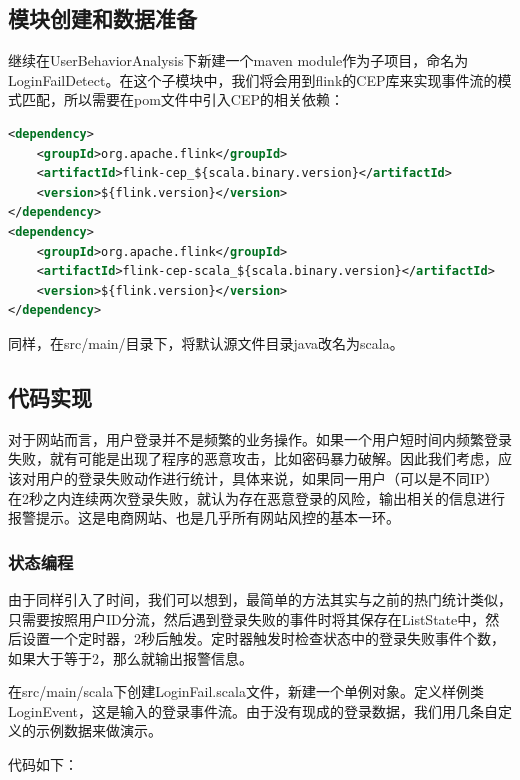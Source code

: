 \documentclass[oneside]{ctexbook}
\begin{document}
\subsection{模块创建和数据准备}

继续在UserBehaviorAnalysis下新建一个maven module作为子项目，命名为LoginFailDetect。在这个子模块中，我们将会用到flink的CEP库来实现事件流的模式匹配，所以需要在pom文件中引入CEP的相关依赖：

\begin{lstlisting}[language=xml]
<dependency>
    <groupId>org.apache.flink</groupId>
    <artifactId>flink-cep_${scala.binary.version}</artifactId>
    <version>${flink.version}</version>
</dependency>
<dependency>
    <groupId>org.apache.flink</groupId>
    <artifactId>flink-cep-scala_${scala.binary.version}</artifactId>
    <version>${flink.version}</version>
</dependency>
\end{lstlisting}

同样，在src/main/目录下，将默认源文件目录java改名为scala。

\subsection{代码实现}

对于网站而言，用户登录并不是频繁的业务操作。如果一个用户短时间内频繁登录失败，就有可能是出现了程序的恶意攻击，比如密码暴力破解。因此我们考虑，应该对用户的登录失败动作进行统计，具体来说，如果同一用户（可以是不同IP）在2秒之内连续两次登录失败，就认为存在恶意登录的风险，输出相关的信息进行报警提示。这是电商网站、也是几乎所有网站风控的基本一环。

\subsubsection{状态编程}

由于同样引入了时间，我们可以想到，最简单的方法其实与之前的热门统计类似，只需要按照用户ID分流，然后遇到登录失败的事件时将其保存在ListState中，然后设置一个定时器，2秒后触发。定时器触发时检查状态中的登录失败事件个数，如果大于等于2，那么就输出报警信息。

在src/main/scala下创建LoginFail.scala文件，新建一个单例对象。定义样例类LoginEvent，这是输入的登录事件流。由于没有现成的登录数据，我们用几条自定义的示例数据来做演示。

代码如下：
\end{document}
